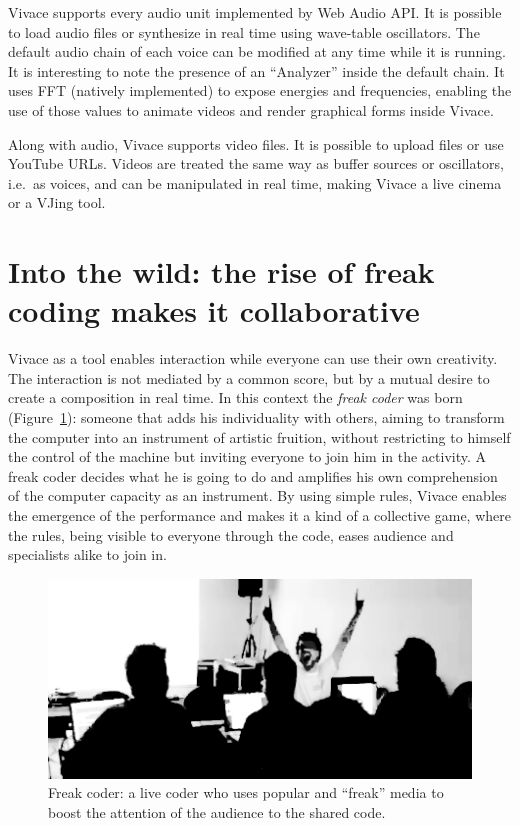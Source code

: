 \documentclass[12pt,times,twocolumn]{article}
\begin{document}
Vivace supports every audio unit implemented by Web Audio API. It is
possible to load audio files or synthesize in real time using
wave-table oscillators. The default audio chain of each voice can be
modified at any time while it is running. It is interesting to note
the presence of an ``Analyzer'' inside the default chain. It uses FFT
(natively implemented) to expose energies and frequencies, enabling
the use of those values to animate videos and render graphical forms
inside Vivace.

Along with audio, Vivace supports video files. It is possible to
upload files or use YouTube URLs. Videos are treated the same way as
buffer sources or oscillators, i.e.\ as voices, and can be manipulated
in real time, making Vivace a live cinema or a VJing tool.

\section{Into the wild: the rise of freak coding makes it collaborative}
Vivace as a tool enables interaction while everyone can use their
own creativity. The interaction is not mediated by a common score, but
by a mutual desire to create a composition in real time. In this
context the \emph{freak coder} was born (Figure~\ref{fig:freakcoder}):
someone that adds his individuality with others, aiming to transform
the computer into an instrument of artistic fruition, without
restricting to himself the control of the machine but inviting
everyone to join him in the activity. A freak coder decides what
he is going to do and amplifies his own comprehension of the computer
capacity as an instrument. By using simple rules, Vivace enables the
emergence of the performance and makes it a kind of a collective game,
where the rules, being visible to everyone through the code, eases audience and
specialists alike to join in.

\begin{figure}[htpb]
  \begin{center}
    \includegraphics[scale=.2]{img/fig_freakcoder_.png}
    \caption{Freak coder: a live coder who uses
      popular and ``freak'' media to boost the attention of the audience to the shared
      code.}
    \label{fig:freakcoder}
  \end{center}
\end{figure}
\end{document}
